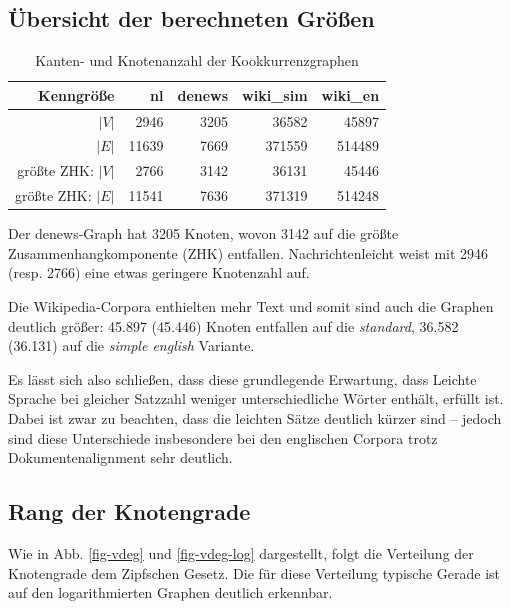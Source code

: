 \documentclass[11pt, a4paper]{article}
\begin{document}
\subsection{Übersicht der berechneten Größen}
\begin{table}[ht]
    \begin{tabular}{*{5}{r}}
    \toprule
    Kenngröße                     & nl        & denews    & wiki\_sim & wiki\_en \\
    \midrule
    $|V|$                         & 2946      & 3205      & 36582     & 45897  \\
    $|E|$                         & 11639     & 7669      & 371559    & 514489 \\
    größte ZHK: $|V|$             & 2766      & 3142      & 36131     & 45446  \\
    größte ZHK: $|E|$             & 11541     & 7636      & 371319    & 514248 \\
    \bottomrule
    \end{tabular}
    \caption{Kanten- und Knotenanzahl der Kookkurrenzgraphen}
    \label{tab-zsf}
\end{table}

Der denews-Graph hat 3205 Knoten, wovon 3142 auf die größte
Zusammenhangkomponente (ZHK) entfallen.
Nachrichtenleicht weist mit 2946 (resp. 2766) eine etwas geringere
Knotenzahl auf.

Die Wikipedia-Corpora enthielten mehr Text und somit sind auch die Graphen
deutlich größer: 45.897 (45.446) Knoten entfallen auf die \emph{standard},
36.582 (36.131) auf die \emph{simple english} Variante.

Es l\"asst sich also schlie\ss{}en, dass diese grundlegende Erwartung, dass
Leichte Sprache bei gleicher Satzzahl weniger unterschiedliche Wörter enthält,
erf\"ullt ist.
Dabei ist zwar zu beachten, dass die leichten Sätze deutlich kürzer sind --
jedoch sind diese Unterschiede insbesondere bei den englischen Corpora trotz Dokumentenalignment sehr deutlich.


\subsection{Rang der Knotengrade}

Wie in Abb. \ref{fig-vdeg} und \ref{fig-vdeg-log} dargestellt, folgt die Verteilung der Knotengrade
dem Zipfschen Gesetz.
Die für diese Verteilung typische Gerade ist auf den logarithmierten Graphen deutlich erkennbar.
\end{document}
